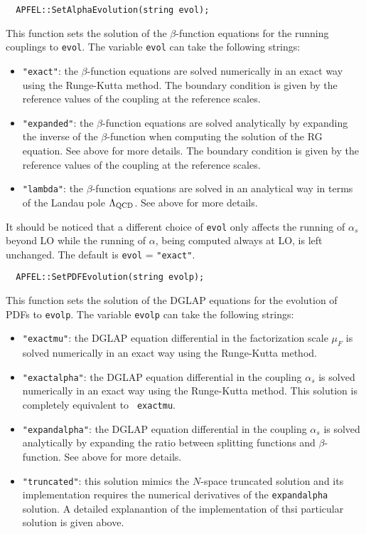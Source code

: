 \documentclass[11pt,a4paper]{article}
\begin{document}
\begin{lstlisting}
  APFEL::SetAlphaEvolution(string evol);
\end{lstlisting}
This function sets the solution of the $\beta$-function equations for
the running couplings to {\tt evol}. The variable {\tt evol} can
take the following strings:
\begin{itemize}
\item {\tt "exact"}: the $\beta$-function equations are solved
  numerically in an exact way using the Runge-Kutta method. The
  boundary condition is given by the reference values of the coupling
  at the reference scales.
\item {\tt "expanded"}: the $\beta$-function equations are solved
  analytically by expanding the inverse of the $\beta$-function when
  computing the solution of the RG equation. See above for more
  details. The boundary condition is given by the reference values of
  the coupling at the reference scales.
\item {\tt "lambda"}: the $\beta$-function equations are solved in an
  analytical way in terms of the Landau pole $\Lambda_{\rm QCD}$. See
  above for more details.
\end{itemize}
It should be noticed that a different choice of {\tt evol} only
affects the running of $\alpha_s$ beyond LO while the running of
$\alpha$, being computed always at LO, is left unchanged. The default
is {\tt evol} = {\tt "exact"}.
\begin{lstlisting}
  APFEL::SetPDFEvolution(string evolp);
\end{lstlisting}
This function sets the solution of the DGLAP equations for the
evolution of PDFs to {\tt evolp}. The variable {\tt evolp} can
take the following strings:
\begin{itemize}
\item {\tt "exactmu"}: the DGLAP equation differential in the
  factorization scale $\mu_F$ is solved numerically in an exact way
  using the Runge-Kutta method.
\item {\tt "exactalpha"}: the DGLAP equation differential in the
  coupling $\alpha_s$ is solved numerically in an exact way using the
  Runge-Kutta method. This solution is completely equivalent to {\tt
    exactmu}.
\item {\tt "expandalpha"}: the DGLAP equation differential in the
  coupling $\alpha_s$ is solved analytically by expanding the ratio
  between splitting functions and $\beta$-function. See above for more
  details.
\item {\tt "truncated"}: this solution mimics the $N$-space truncated
  solution and its implementation requires the numerical derivatives
  of the {\tt expandalpha} solution. A detailed explanantion of the
  implementation of thsi particular solution is given above.
\end{itemize}
\end{document}

